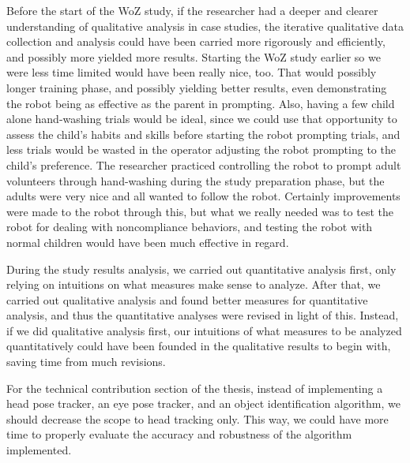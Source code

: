 Before the start of the WoZ study, if the researcher had a deeper and clearer understanding of qualitative analysis in case studies, the iterative qualitative data collection and analysis could have been carried more rigorously and efficiently, and possibly more yielded more results.  Starting the WoZ study earlier so we were less time limited would have been really nice, too.  That would possibly longer training phase, and possibly yielding better results, even demonstrating the robot being as effective as the parent in prompting.  Also, having a few child alone hand-washing trials would be ideal, since we could use that opportunity to assess the child's habits and skills before starting the robot prompting trials, and less trials would be wasted in the operator adjusting the robot prompting to the child's preference.  The researcher practiced controlling the robot to prompt adult volunteers through hand-washing during the study preparation phase, but the adults were very nice and all wanted to follow the robot.  Certainly improvements were made to the robot through this, but what we really needed was to test the robot for dealing with noncompliance behaviors, and testing the robot with normal children would have been much effective in regard.

During the study results analysis, we carried out quantitative analysis first, only relying on intuitions on what measures make sense to analyze.  After that, we carried out qualitative analysis and found better measures for quantitative analysis, and thus the quantitative analyses were revised in light of this.  Instead, if we did qualitative analysis first, our intuitions of what measures to be analyzed quantitatively could have been founded in the qualitative results to begin with, saving time from much revisions.

For the technical contribution section of the thesis, instead of implementing a head pose tracker, an eye pose tracker, and an object identification algorithm, we should decrease the scope to head tracking only.  This way, we could have more time to properly evaluate the accuracy and robustness of the algorithm implemented.